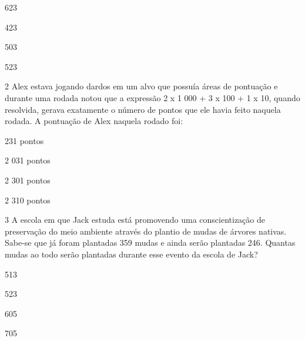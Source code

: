 {\begin{escolha}
\item
  623
\item
  423
\item
  503
\item
  523
\end{escolha}


\num{2} Alex estava jogando dardos em um alvo que possuía áreas de
pontuação e durante uma rodada notou que a expressão 2 x 1 000 + 3 x 100
+ 1 x 10, quando resolvida, gerava exatamente o número de pontos que ele
havia feito naquela rodada. A pontuação de Alex naquela rodado foi:

\begin{escolha}
\item
  231 pontos
\item
  2 031 pontos
\item
  2 301 pontos
\item
  2 310 pontos
\end{escolha}


\num{3} A escola em que Jack estuda está promovendo uma conscientização de
preservação do meio ambiente através do plantio de mudas de árvores
nativas. Sabe-se que já foram plantadas 359 mudas e ainda serão
plantadas 246. Quantas mudas ao todo serão plantadas durante esse evento
da escola de Jack?

\begin{escolha}
\item
  513
\item
  523
\item
  605
\item
  705
\end{escolha}

}
